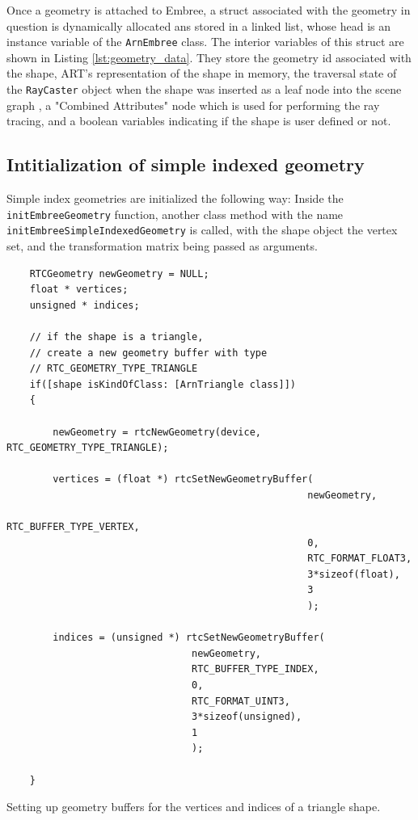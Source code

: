 Once a geometry is attached to Embree, a  struct associated with the geometry in question is dynamically allocated ans stored in a linked list, whose head is an instance variable of the \texttt{ArnEmbree} class. The interior variables of this struct are shown in Listing \ref{lst:geometry_data}. They store the geometry id associated with the shape, ART's representation of the shape in memory, the traversal state of the \texttt{RayCaster} object when the shape was inserted as a leaf node into the scene graph , a "Combined Attributes" node which is used for performing the ray tracing, and a boolean variables indicating if the shape is user defined or not.


\subsection{Intitialization of simple indexed geometry}
Simple index geometries are initialized the following way: Inside the \texttt{initEmbreeGeometry} function, another class method with the name \texttt{initEmbreeSimpleIndexedGeometry} is called, with the shape object the vertex set, and the transformation matrix being passed as arguments. 

\begin{listing} 
	\begin{lstlisting}
	RTCGeometry newGeometry = NULL;
	float * vertices;
	unsigned * indices;
	
	// if the shape is a triangle, 
	// create a new geometry buffer with type
	// RTC_GEOMETRY_TYPE_TRIANGLE
	if([shape isKindOfClass: [ArnTriangle class]]) 
	{
	
		newGeometry = rtcNewGeometry(device, RTC_GEOMETRY_TYPE_TRIANGLE);
		
		vertices = (float *) rtcSetNewGeometryBuffer(
													newGeometry,
													RTC_BUFFER_TYPE_VERTEX,
													0,
													RTC_FORMAT_FLOAT3,
													3*sizeof(float),
													3
													);
		
		indices = (unsigned *) rtcSetNewGeometryBuffer(
		                        newGeometry,
		                        RTC_BUFFER_TYPE_INDEX,
		                        0,
		                        RTC_FORMAT_UINT3,
		                        3*sizeof(unsigned),
		                        1
		                        );
	
	}
	\end{lstlisting}
	\caption{Setting up geometry buffers for the vertices and indices of a triangle shape.}
	\label{lst:geometry_buffer}
\end{listing}

